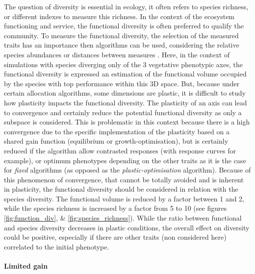 The question of diversity is essential in ecology, it often refers to species richness, or different indexes to measure this richness. In the context of the ecosystem functioning and service, the functional diversity is often preferred to qualify the community. To measure the functional diversity, the selection of the measured traits has an importance then algorithms can be used, considering the relative species abundances or distances between measures \parencite{laliberte_distance-based_2010}. Here, in the context of simulations with species diverging only of the 3 vegetative phenotypic axes, the functional diversity is expressed an estimation of the functional volume occupied by the species with top performance within this 3D space. But, because under certain allocation algorithms, some dimensions are plastic, it is difficult to study how plasticity impacts the functional diversity. The plasticity of an axis can lead to convergence and certainly reduce the potential functional diversity as only a subspace is considered. This is problematic in this context because there is a high convergence due to the specific implementation of the plasticity based on a shared gain function (equilibrium or growth-optimisation), but is certainly reduced if the algorithm allow contrasted responses (with response curves for example), or optimum phenotypes depending on the other traits as it is the case for \textit{fixed} algorithms (as opposed as the \textit{plastic-optimisation} algorithm). Because of this phenomenon of convergence, that cannot be totally avoided and is inherent in plasticity, the functional diversity should be considered in relation with the species diversity. The functional volume is reduced by a factor between 1 and 2, while the species richness is increased by a factor from 5 to 10 (see figures \ref{fig:function_div}, \& \ref{fig:species_richness}). While the ratio between functional and species diversity decreases in plastic conditions, the overall effect on diversity could be positive, especially if there are other traits (non considered here) correlated to the initial phenotype. 

\paragraph{Limited gain}

